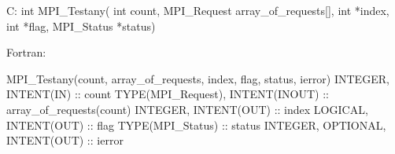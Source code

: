 C:
int MPI_Testany(
    int count, MPI_Request array_of_requests[],
    int *index, int *flag, MPI_Status *status)

Fortran:
   
MPI_Testany(count, array_of_requests, index, flag, status, ierror)
INTEGER, INTENT(IN) :: count
TYPE(MPI_Request), INTENT(INOUT) :: array_of_requests(count)
INTEGER, INTENT(OUT) :: index
LOGICAL, INTENT(OUT) :: flag
TYPE(MPI_Status) :: status
INTEGER, OPTIONAL, INTENT(OUT) :: ierror
